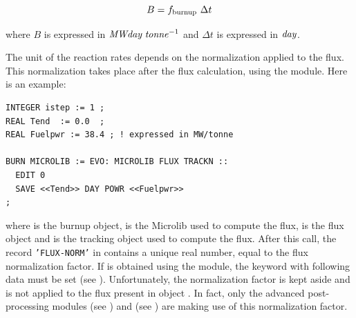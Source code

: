 \begin{equation}
B=f_{\rm burnup} \ \Delta t
\label{eq:eq3}
\end{equation}

\noindent where $B$ is expressed in ${\it MWday}\;{\it tonne}^{-1}$ and $\Delta t$
is expressed in ${\it day}$.

\vskip 0.2cm

The unit of the reaction rates depends on the normalization applied to the flux. This normalization
takes place after the flux calculation, using the  module. Here is an example:

\begin{verbatim}
INTEGER istep := 1 ;
REAL Tend  := 0.0  ;
REAL Fuelpwr := 38.4 ; ! expressed in MW/tonne

BURN MICROLIB := EVO: MICROLIB FLUX TRACKN ::
  EDIT 0
  SAVE <<Tend>> DAY POWR <<Fuelpwr>>
;
\end{verbatim}

\noindent where  is the burnup object,  is the Microlib used to compute the flux,  is the flux
object and  is the tracking object used to compute the flux. After this call, the record
{\tt 'FLUX-NORM'} in  contains a unique real number, equal to the flux normalization factor. If  is
obtained using the  module, the  keyword with following data must be set (see ).
Unfortunately, the normalization factor is kept aside and is not applied to the flux present in object . In
fact, only the advanced post-processing modules  (see ) and  (see )
are making use of this normalization factor.

\eject
